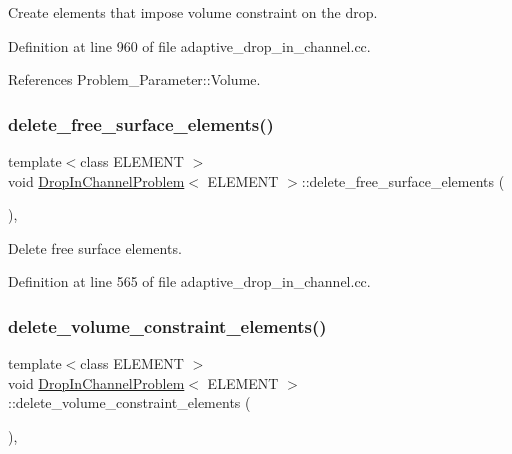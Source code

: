 Create elements that impose volume constraint on the drop. 



Definition at line 960 of file adaptive\+\_\+drop\+\_\+in\+\_\+channel.\+cc.



References Problem\+\_\+\+Parameter\+::\+Volume.

\mbox{\label{classDropInChannelProblem_a4463a1b341429f5a2c84a493aabb3a14}} 
\subsubsection{\texorpdfstring{delete\+\_\+free\+\_\+surface\+\_\+elements()}{delete\_free\_surface\_elements()}}
{\footnotesize\ttfamily template$<$class E\+L\+E\+M\+E\+NT $>$ \\
void \hyperlink{classDropInChannelProblem}{Drop\+In\+Channel\+Problem}$<$ E\+L\+E\+M\+E\+NT $>$\+::delete\+\_\+free\+\_\+surface\+\_\+elements (\begin{DoxyParamCaption}{ }\end{DoxyParamCaption})\hspace{0.3cm}{\ttfamily [inline]}, {\ttfamily [private]}}



Delete free surface elements. 



Definition at line 565 of file adaptive\+\_\+drop\+\_\+in\+\_\+channel.\+cc.

\mbox{\label{classDropInChannelProblem_aec42cdf762f8b64c064db84df7f40f0a}} 
\subsubsection{\texorpdfstring{delete\+\_\+volume\+\_\+constraint\+\_\+elements()}{delete\_volume\_constraint\_elements()}}
{\footnotesize\ttfamily template$<$class E\+L\+E\+M\+E\+NT $>$ \\
void \hyperlink{classDropInChannelProblem}{Drop\+In\+Channel\+Problem}$<$ E\+L\+E\+M\+E\+NT $>$\+::delete\+\_\+volume\+\_\+constraint\+\_\+elements (\begin{DoxyParamCaption}{ }\end{DoxyParamCaption})\hspace{0.3cm}{\ttfamily [inline]}, {\ttfamily [private]}}




